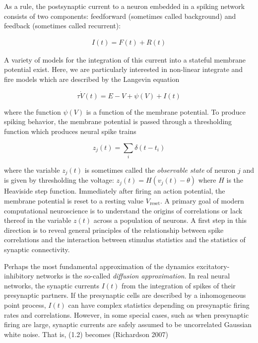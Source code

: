 \documentclass{ucetd}
\begin{document}
As a rule, the postsynaptic current to a neuron embedded in a spiking network consists of two components: feedforward (sometimes called background) and feedback (sometimes called recurrent):

\begin{align}
I(t) = F(t) + R(t)
\end{align}

A variety of models for the integration of this current into a stateful membrane potential exist. Here, we are particularly interested in non-linear integrate and fire models which are described by the Langevin equation

\begin{equation}
\tau\dot{V}(t) = E - V + \psi(V) + I(t)
\end{equation}

where the function $\psi(V)$ is a function of the membrane potential. To produce spiking behavior, the membrane potential is passed through a thresholding function which produces neural spike trains

\begin{equation}
z_{j}(t) = \sum_{i} \delta(t-t_{i})
\end{equation}

where the variable $z_{j}(t)$ is sometimes called the \emph{observable state} of neuron $j$ and is given by thresholding the voltage: $z_{j}(t) = H(v_{j}(t) - \theta)$ where $H$ is the Heaviside step function. Immediately after firing an action potential, the membrane potential is reset to a resting value $V_{\mathrm{reset}}$. A primary goal of modern computational neuroscience is to understand the origins of correlations or lack thereof in the variable $z(t)$ across a population of neurons. A first step in this direction is to reveal general principles of the relationship between spike correlations and the interaction between stimulus statistics and the statistics of synaptic connectivity.

Perhaps the most fundamental approximation of the dynamics excitatory-inhibitory networks is the so-called \emph{diffusion approximation}. In real neural networks, the synaptic currents $I(t)$ from the integration of spikes of their presynaptic partners. If the presynaptic cells are described by a inhomogeneous point process, $I(t)$ can have complex statistics depending on presynaptic firing rates and correlations. However, in some special cases, such as when presynaptic firing are large, synaptic currents are safely assumed to be uncorrelated Gaussian white noise. That is, (1.2) becomes (Richardson 2007)
\end{document}
